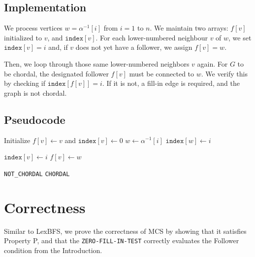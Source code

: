 \subsection{Implementation}
We process vertices $w = \alpha^{-1}[i]$ from $i = 1$ to $n$. We maintain two arrays: $f[v]$ initialized to $v$, and $\texttt{index}[v]$. For each lower-numbered neighbour $v$ of $w$, we set $\texttt{index}[v] = i$ and, if $v$ does not yet have a follower, we assign $f[v] = w$. 

Then, we loop through those same lower-numbered neighbors $v$ again. For $G$ to be chordal, the designated follower $f[v]$ must be connected to $w$. We verify this by checking if $\texttt{index}[f[v]] = i$. If it is not, a fill-in edge is required, and the graph is not chordal.

\subsection{Pseudocode}


\begin{algorithm}[H]
\caption{Zero Fill-In Test}
\begin{algorithmic}[1]
        \State Initialize $f[v] \gets v$ and $\texttt{index}[v] \gets 0$ 
    \EndFor
        \State $w \gets \alpha^{-1}[i]$
        \State $\texttt{index}[w] \gets i$
        
            \State $\texttt{index}[v] \gets i$
             $f[v] \gets w$ \EndIf
        \EndFor
        
                \State \Return \texttt{NOT\_CHORDAL} 
            \EndIf
        \EndFor
    \EndFor
    \State \Return \texttt{CHORDAL}
\EndFunction
\end{algorithmic}
\end{algorithm}

\section{Correctness}

Similar to LexBFS, we prove the correctness of MCS by showing that it satisfies Property P, and that the \texttt{ZERO-FILL-IN-TEST} correctly evaluates the Follower condition from the Introduction.

